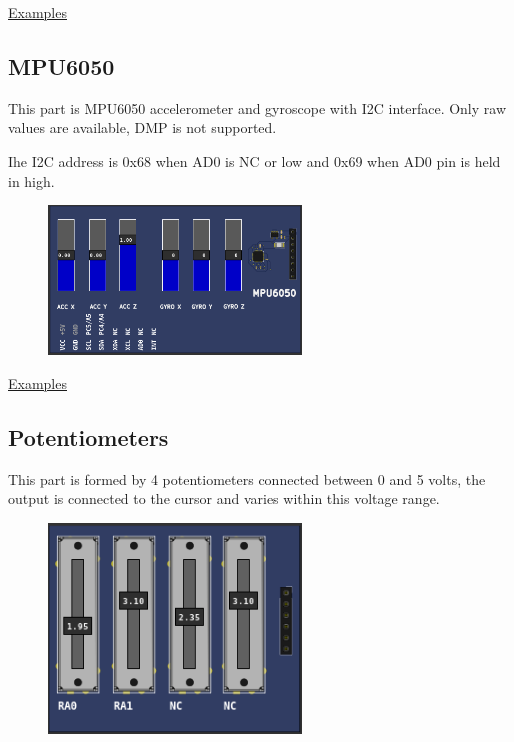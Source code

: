 \href{https://lcgamboa.github.io/picsimlab_examples/parts_LM35_(Temperature).html}{Examples}

\vspace{0.5cm}


\subsection{MPU6050}

This part is MPU6050 accelerometer and gyroscope with I2C interface. 
Only raw values are available, DMP is not supported.

Ihe I2C address is 0x68 when AD0 is NC or low and 0x69 when AD0 pin is held in high.

\begin{figure}[H]
\center
\includegraphics[width=0.6\textwidth]{img/part_mpu6050.png} 
\end{figure} 


\href{https://lcgamboa.github.io/picsimlab_examples/parts_MPU6050.html}{Examples}

\vspace{0.5cm}

\subsection{Potentiometers}

This part is formed by 4 potentiometers connected between 0 and 5 volts, the output is connected to the cursor and varies within this voltage range.
\begin{figure}[H]
\center
\includegraphics[width=0.6\textwidth]{img/part_pot.png} 
\end{figure} 

